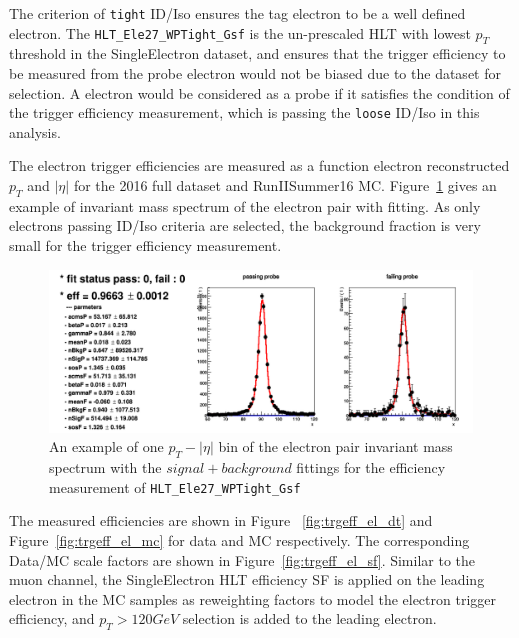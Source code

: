 The criterion of \texttt{tight} ID/Iso ensures the tag electron to be a well defined electron. The \texttt{HLT\_Ele27\_WPTight\_Gsf} is the un-prescaled HLT with lowest $p_T$ threshold in the SingleElectron dataset, and ensures that the trigger efficiency to be measured from the probe electron would not be biased due to the dataset for selection. A electron would be considered as a probe if it satisfies the condition of the trigger efficiency measurement, which is passing the \texttt{loose} ID/Iso in this analysis.

\vspace{0.3cm}
The electron trigger efficiencies are measured as a function electron reconstructed $p_T$ and $|\eta|$ for the 2016 full dataset and RunIISummer16 MC. Figure~\ref{fig:bg_etrgtnp} gives an example of invariant mass spectrum of the electron pair with fitting. As only electrons passing ID/Iso criteria are selected, the background fraction is very small for the trigger efficiency measurement.

\begin{figure}[htpb]
\begin{center}
\includegraphics[width=0.95\linewidth, page=1]{figures/bg_etrgtnp.png}
\caption{An example of one  $p_T - |\eta|$ bin of the electron pair invariant mass spectrum with the $signal+background$ fittings for the efficiency measurement of \texttt{HLT\_Ele27\_WPTight\_Gsf}}
\label{fig:bg_etrgtnp}
\end{center}
\end{figure}

\vspace{0.3cm}
The measured efficiencies are shown in Figure ~\ref{fig:trgeff_el_dt} and Figure~\ref{fig:trgeff_el_mc} for data and MC respectively. The corresponding Data/MC scale factors are shown in Figure~\ref{fig:trgeff_el_sf}. Similar to the muon channel, the SingleElectron HLT efficiency SF is applied on the leading electron in the MC samples as reweighting factors to model the electron trigger efficiency, and $p_T > 120GeV$ selection is added to the leading electron.

